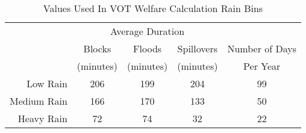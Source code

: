 \captionsetup{labelsep=newline}
\begin{table}[!htbp]
\centering

\caption{Values Used In VOT Welfare Calculation \newline Rain Bins}
\label{table:VOT-rain-desc}

  \begin{tabular}{r c c c c}
    \hline
    \hline
    & \multicolumn{3}{c}{Average Duration} &  \\
    & Blocks & Floods & Spillovers & Number of Days \\
    & (minutes) & (minutes) & (minutes) & Per Year \\
    \hline
    Low Rain & 206 & 199 & 204 & 99  \\
    Medium Rain & 166 & 170 & 133 & 50 \\
    Heavy Rain & 72 & 74 & 32 & 22 \\
    \hline
    \hline
  \end{tabular}

\end{table}